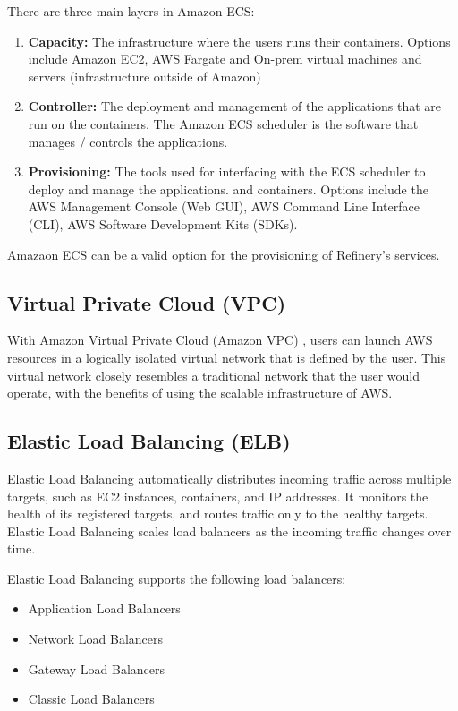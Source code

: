 		There are three main layers in Amazon ECS:
		\begin{enumerate}
			\item \textbf{Capacity:} The infrastructure where the users runs their containers. Options include Amazon EC2, 
			AWS Fargate and On-prem virtual machines and servers (infrastructure outside of Amazon) 
			\item \textbf{Controller:} The deployment and management of the applications that are run on the containers. The Amazon
			ECS scheduler is the software that manages / controls the applications.
			\item \textbf{Provisioning:} The tools used for interfacing with the ECS scheduler to deploy and manage the applications.
			and containers. Options include the AWS Management Console (Web GUI), AWS Command Line Interface (CLI), 
			AWS Software Development Kits (SDKs).
		\end{enumerate}

		Amazaon ECS can be a valid option for the provisioning of Refinery's services. 

	\subsection{Virtual Private Cloud (VPC)}
		With Amazon Virtual Private Cloud (Amazon VPC) \cite{vpc}, users can launch AWS resources in a logically 
		isolated virtual network that is defined by the user. This virtual network closely resembles a traditional network 
		that the user would operate, with the benefits of using the scalable infrastructure of AWS.

	\subsection{Elastic Load Balancing (ELB)}
		Elastic Load Balancing \cite{elb} automatically distributes incoming traffic across multiple targets, 
		such as EC2 instances, containers, and IP addresses. 
		It monitors the health of its registered targets, and routes traffic only to the healthy targets. 
		Elastic Load Balancing scales load balancers as the incoming traffic changes over time. 

		Elastic Load Balancing supports the following load balancers: 
		\begin{itemize}
			\item Application Load Balancers
			\item Network Load Balancers
			\item Gateway Load Balancers
			\item Classic Load Balancers
		\end{itemize}

